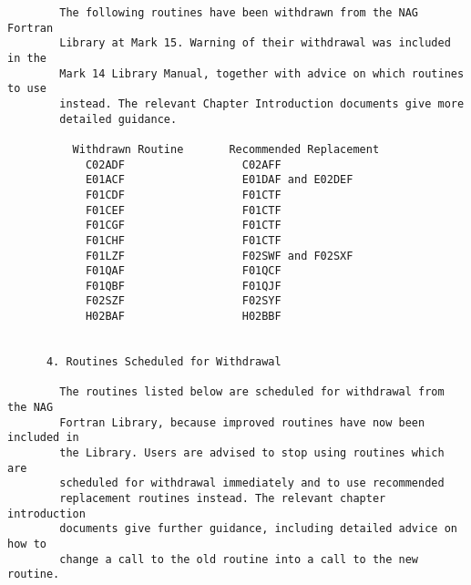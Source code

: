\begin{small}
\begin{verbatim}
        The following routines have been withdrawn from the NAG Fortran          
        Library at Mark 15. Warning of their withdrawal was included in the      
        Mark 14 Library Manual, together with advice on which routines to use    
        instead. The relevant Chapter Introduction documents give more           
        detailed guidance.                                                       
                                                                                 
          Withdrawn Routine       Recommended Replacement                        
            C02ADF                  C02AFF                                       
            E01ACF                  E01DAF and E02DEF                            
            F01CDF                  F01CTF                                       
            F01CEF                  F01CTF                                       
            F01CGF                  F01CTF                                       
            F01CHF                  F01CTF                                       
            F01LZF                  F02SWF and F02SXF                            
            F01QAF                  F01QCF                                       
            F01QBF                  F01QJF                                       
            F02SZF                  F02SYF                                       
            H02BAF                  H02BBF                                       
                                                                                 
                                                                                 
      4. Routines Scheduled for Withdrawal                                       
                                                                                 
        The routines listed below are scheduled for withdrawal from the NAG      
        Fortran Library, because improved routines have now been included in     
        the Library. Users are advised to stop using routines which are          
        scheduled for withdrawal immediately and to use recommended              
        replacement routines instead. The relevant chapter introduction          
        documents give further guidance, including detailed advice on how to     
        change a call to the old routine into a call to the new routine.         
                                                                                 

\end{verbatim}
\end{small}
